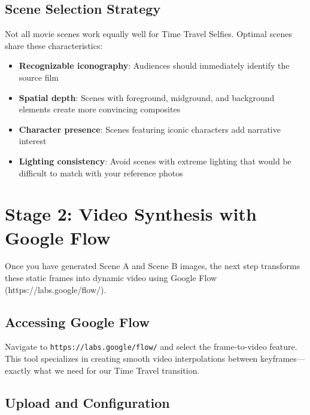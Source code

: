 \subsection{Scene Selection Strategy}

Not all movie scenes work equally well for Time Travel Selfies. Optimal scenes share these characteristics:

\begin{itemize}
\item \textbf{Recognizable iconography}: Audiences should immediately identify the source film
\item \textbf{Spatial depth}: Scenes with foreground, midground, and background elements create more convincing composites
\item \textbf{Character presence}: Scenes featuring iconic characters add narrative interest
\item \textbf{Lighting consistency}: Avoid scenes with extreme lighting that would be difficult to match with your reference photos
\end{itemize}

\section{Stage 2: Video Synthesis with Google Flow}
\label{sec:google-flow}

Once you have generated Scene A and Scene B images, the next step transforms these static frames into dynamic video using Google Flow (https://labs.google/flow/).

\subsection{Accessing Google Flow}

Navigate to \texttt{https://labs.google/flow/} and select the frame-to-video feature. This tool specializes in creating smooth video interpolations between keyframes—exactly what we need for our Time Travel transition.

\subsection{Upload and Configuration}

